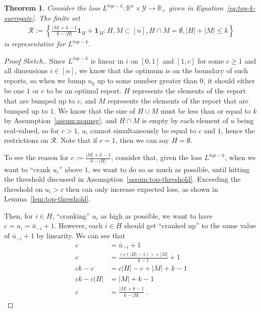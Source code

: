 \documentclass[12pt]{article}
\newcommand{\reals}{\mathbb{R}}
\newcommand{\R}{\mathcal{R}}
\newcommand{\Y}{\mathcal{Y}}
\newtheorem{theorem}{Theorem}
\begin{document}
\begin{theorem}\label{thm:finite-set}
	Consider the loss $L^{top-k} : \reals^n \times \Y \to \reals_+$ given in Equation~\ref{eq:top-k-surrogate}.  
	The finite set
	\begin{align*}
	\R := \left\{ \frac{|M| + k -1}{k - |H|} \mathbf{1}_H + \mathbf{1}_M : H, M \subset [n], H\cap M = \emptyset, |H| + |M| \leq k \right\}
	\end{align*}
	is representative for $L^{top-k}$.
\end{theorem}
\begin{proof}[Proof Sketch.]
	Since $L^{top-k}$ is linear in $i$ on $[0,1]$ and $[1, c]$ for some $c \geq 1$ and all dimensions $i \in [n]$, we know that the optimum is on the boundary of such reports, so when we bump $u_y$ up to some number greater than $0$, it should either be one $1$ or $c$ to be an optimal report.
	$H$ represents the elements of the report that are bumped up to $c$, and $M$ represents the elements of the report that are bumped up to $1$.
	We know that the size of $H \cup M$ must be less than or equal to $k$ by Assumption~\ref{assum:nonneg}, and $H \cap M$ is empty by each element of $u$ being real-valued, so for $c > 1$, $u_i$ cannot simultaneously be equal to $c$ and $1$, hence the restrictions on $\R$.
	Note that if $c = 1$, then we can say $H = \emptyset$.
	
	To see the reason for $c := \frac{|M| + k -1}{k - |H|}$, consider that, given the loss $L^{top-k}$, when we want to ``crank $u_i$'' above $1$, we want to do so as much as possible, until hitting the threshold discussed in Assumption~\ref{assum:top-threshold}.
	Exceeding the threshold on $u_i > c$ then can only increase expected loss, as shown in Lemma~\ref{lem:top-threshold}.
	
	Then, for $i \in H$, ``cranking'' $u_i$ as high as possible, we want to have $c = u_i = \bar u _{-i} + 1$.
	However, each $i \in H$ should get ``cranked up'' to the same value of $\bar u_{-i} + 1$ by linearity.
	We can see that 
	\begin{align*}
	c &= \bar u_{-i} + 1 \\
	c &= \frac{(c (|H|-1)) + |M|}{k-1} + 1\\
	ck-c &= c|H| - c + |M| + k - 1\\
	ck - c|H| &= |M| + k - 1\\
	c &= \frac{|M|+k-1}{k-|H|}~.~
	\end{align*}
\end{proof}
\end{document}
